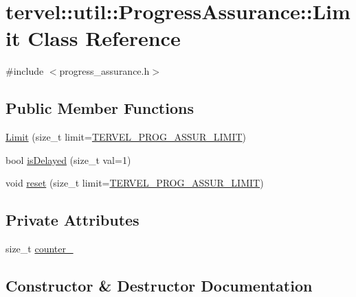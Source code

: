 \hypertarget{classtervel_1_1util_1_1_progress_assurance_1_1_limit}{}\section{tervel\+:\+:util\+:\+:Progress\+Assurance\+:\+:Limit Class Reference}
\label{classtervel_1_1util_1_1_progress_assurance_1_1_limit}


{\ttfamily \#include $<$progress\+\_\+assurance.\+h$>$}

\subsection*{Public Member Functions}
\begin{DoxyCompactItemize}
\item 
\hyperlink{classtervel_1_1util_1_1_progress_assurance_1_1_limit_a01796959d367f7424ce8161e529f7232}{Limit} (size\+\_\+t limit=\hyperlink{util_8h_ad2402840ec2629b707473cbb5e0e26d7}{T\+E\+R\+V\+E\+L\+\_\+\+P\+R\+O\+G\+\_\+\+A\+S\+S\+U\+R\+\_\+\+L\+I\+M\+I\+T})
\item 
bool \hyperlink{classtervel_1_1util_1_1_progress_assurance_1_1_limit_a7734a52404e54e898f5a14b3a8979077}{is\+Delayed} (size\+\_\+t val=1)
\item 
void \hyperlink{classtervel_1_1util_1_1_progress_assurance_1_1_limit_a03a87c8697ddfb04712851114bb66e32}{reset} (size\+\_\+t limit=\hyperlink{util_8h_ad2402840ec2629b707473cbb5e0e26d7}{T\+E\+R\+V\+E\+L\+\_\+\+P\+R\+O\+G\+\_\+\+A\+S\+S\+U\+R\+\_\+\+L\+I\+M\+I\+T})
\end{DoxyCompactItemize}
\subsection*{Private Attributes}
\begin{DoxyCompactItemize}
\item 
size\+\_\+t \hyperlink{classtervel_1_1util_1_1_progress_assurance_1_1_limit_a08bd5c60326801e6337cbe1b3f184ab1}{counter\+\_\+}
\end{DoxyCompactItemize}


\subsection{Constructor \& Destructor Documentation}
\hypertarget{classtervel_1_1util_1_1_progress_assurance_1_1_limit_a01796959d367f7424ce8161e529f7232}{}
